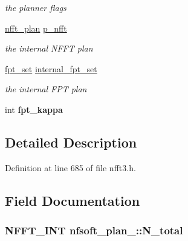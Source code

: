 \begin{DoxyCompactItemize}
\begin{DoxyCompactList}\small\item\em the planner flags \end{DoxyCompactList}\item 
\hypertarget{structnfsoft__plan___a06568ec06f0c56db50823c12f376061c}{\hyperlink{structnfft__plan}{nfft\-\_\-plan} \hyperlink{structnfsoft__plan___a06568ec06f0c56db50823c12f376061c}{p\-\_\-nfft}}\label{structnfsoft__plan___a06568ec06f0c56db50823c12f376061c}

\begin{DoxyCompactList}\small\item\em the internal N\-F\-F\-T plan \end{DoxyCompactList}\item 
\hypertarget{structnfsoft__plan___a39a07d81bf6117dca5530d76beaf6b31}{\hyperlink{nfft3_8h_a73d630ac21d6474ba0693f124d465e15}{fpt\-\_\-set} \hyperlink{structnfsoft__plan___a39a07d81bf6117dca5530d76beaf6b31}{internal\-\_\-fpt\-\_\-set}}\label{structnfsoft__plan___a39a07d81bf6117dca5530d76beaf6b31}

\begin{DoxyCompactList}\small\item\em the internal F\-P\-T plan \end{DoxyCompactList}\item 
\hypertarget{structnfsoft__plan___a65128958f30b266d01000b588069108b}{int {\bfseries fpt\-\_\-kappa}}\label{structnfsoft__plan___a65128958f30b266d01000b588069108b}

\end{DoxyCompactItemize}


\subsection{Detailed Description}


Definition at line 685 of file nfft3.\-h.



\subsection{Field Documentation}
\hypertarget{structnfsoft__plan___a1a87be12611ae7fc95df3b21f8d4e762}{
\subsubsection[{N\-\_\-total}]{\setlength{\rightskip}{0pt plus 5cm}N\-F\-F\-T\-\_\-\-I\-N\-T nfsoft\-\_\-plan\-\_\-\-::\-N\-\_\-total}}\label{structnfsoft__plan___a1a87be12611ae7fc95df3b21f8d4e762}


